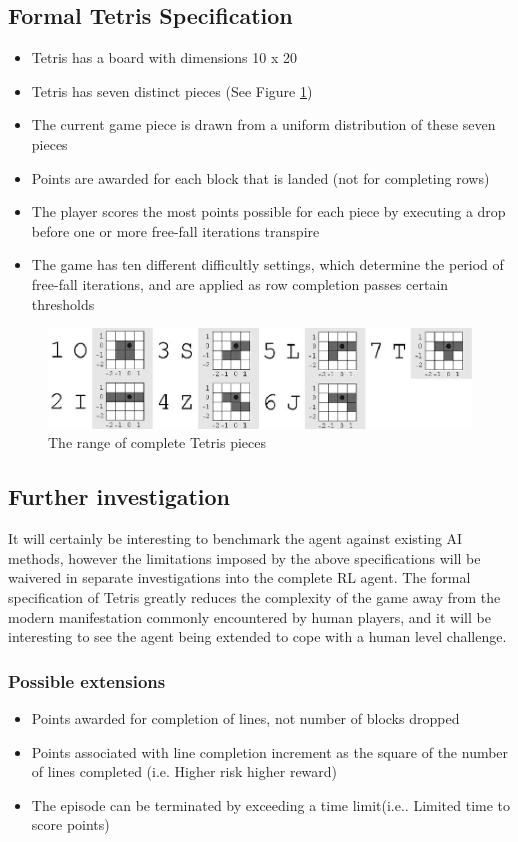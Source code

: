 \documentclass[a4paper]{article}%
\begin{document}
\subsection{Formal Tetris Specification \citep{tetstand}} 
\begin{itemize}
\item{Tetris has a board with dimensions 10 x 20}
\item{Tetris has seven distinct pieces (See Figure \ref{fig:pieces})}
\item{The current game piece is drawn from a uniform distribution of these seven pieces}
\item{Points are awarded for each block that is landed (not for completing rows)}
\item{The player scores the most points possible for each piece by executing a drop before one or more free-fall iterations transpire}
\item{The game has ten different difficultly settings, which determine the period of free-fall iterations, and are applied as row completion passes certain thresholds}
\end{itemize}

\begin{figure}[h]
\centering
\includegraphics[width=\textwidth]{tetrisblocks.jpg}
\caption{The range of complete Tetris pieces}
\label{fig:pieces}
\end{figure}

\subsection{Further investigation}

It will certainly be interesting to benchmark the agent against existing AI methods, however the limitations imposed by the above specifications will be waivered in separate investigations into the complete RL agent. The formal specification of Tetris greatly reduces the complexity of the game away from the modern manifestation commonly encountered by human players, and it will be interesting to see the agent being extended to cope with a human level challenge.

\subsubsection{Possible extensions}
\begin{itemize}
\item{Points awarded for completion of lines, not number of blocks dropped}
\item{Points associated with line completion increment as the square of the number of lines completed (i.e. Higher risk higher reward)}
\item{The episode can be terminated by exceeding a time limit(i.e.. Limited time to score points)}
\end{itemize}
\end{document}
